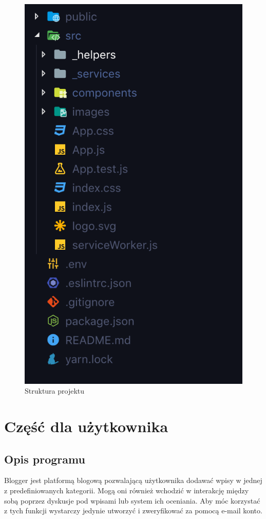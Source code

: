 \documentclass[declaration,shortabstract]{iithesis}
\begin{document}
\begin{figure}
    \centering
    \includegraphics[]{images/forontend.png}  
    \caption{Struktura projektu}
    \label{fig:frontend_struct}
\end{figure}
\chapter{Część dla użytkownika}
\section{Opis programu}
Blogger jest platformą blogową pozwalającą użytkownika dodawać wpisy w jednej z predefiniowanych kategorii. Mogą oni również wchodzić w interakcję między sobą poprzez dyskusje pod wpisami lub system ich oceniania. Aby móc korzystać z tych funkcji wystarczy jedynie utworzyć i zweryfikować za pomocą e-mail konto.
\end{document}
